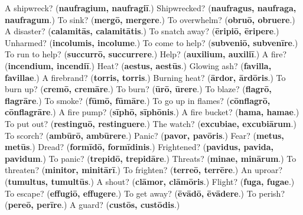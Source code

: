 \begin{tcolorbox}[breakable,colback=teal!4,colframe=teal!35!black,title={Before you move on}]
A shipwreck? (\textbf{naufragium, naufragiī}.) Shipwrecked? (\textbf{naufragus, naufraga, naufragum}.) To sink? (\textbf{mergō, mergere}.) To overwhelm? (\textbf{obruō, obruere}.) A disaster? (\textbf{calamitās, calamitātis}.) To snatch away? (\textbf{ēripiō, ēripere}.) Unharmed? (\textbf{incolumis, incolume}.) To come to help? (\textbf{subveniō, subvenīre}.) To run to help? (\textbf{succurrō, succurrere}.) Help? (\textbf{auxilium, auxiliī}.) A fire? (\textbf{incendium, incendiī}.) Heat? (\textbf{aestus, aestūs}.) Glowing ash? (\textbf{favilla, favillae}.) A firebrand? (\textbf{torris, torris}.) Burning heat? (\textbf{ārdor, ārdōris}.) To burn up? (\textbf{cremō, cremāre}.) To burn? (\textbf{ūrō, ūrere}.) To blaze? (\textbf{flagrō, flagrāre}.) To smoke? (\textbf{fūmō, fūmāre}.) To go up in flames? (\textbf{cōnflagrō, cōnflagrāre}.) A fire pump? (\textbf{sīphō, sīphōnis}.) A fire bucket? (\textbf{hama, hamae}.) To put out? (\textbf{restinguō, restinguere}.) The watch? (\textbf{excubiae, excubiārum}.) To scorch? (\textbf{ambūrō, ambūrere}.) Panic? (\textbf{pavor, pavōris}.) Fear? (\textbf{metus, metūs}.) Dread? (\textbf{formīdō, formīdinis}.) Frightened? (\textbf{pavidus, pavida, pavidum}.) To panic? (\textbf{trepidō, trepidāre}.) Threats? (\textbf{minae, minārum}.) To threaten? (\textbf{minitor, minitārī}.) To frighten? (\textbf{terreō, terrēre}.) An uproar? (\textbf{tumultus, tumultūs}.) A shout? (\textbf{clāmor, clāmōris}.) Flight? (\textbf{fuga, fugae}.) To escape? (\textbf{effugiō, effugere}.) To get away? (\textbf{ēvādō, ēvādere}.) To perish? (\textbf{pereō, perīre}.) A guard? (\textbf{custōs, custōdis}.)
\end{tcolorbox}
